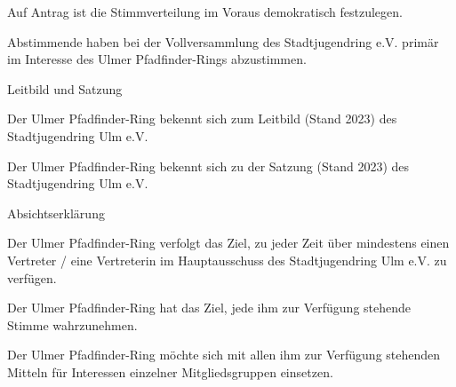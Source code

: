 \begin{legal}
\begin{legal}
\begin{legal}
                    \item Auf Antrag ist die Stimmverteilung im Voraus demokratisch festzulegen.
                    \item Abstimmende haben bei der Vollversammlung des Stadtjugendring e.V. primär 
                          im Interesse des Ulmer Pfadfinder-Rings abzustimmen.
                \end{legal}
            \item Leitbild und Satzung
                \begin{legal}
                    \item Der Ulmer Pfadfinder-Ring bekennt sich zum Leitbild (Stand 2023) des 
                          Stadtjugendring Ulm e.V.
                    \item Der Ulmer Pfadfinder-Ring bekennt sich zu der Satzung (Stand 2023) des 
                          Stadtjugendring Ulm e.V.
                \end{legal}
        \end{legal}
    \item Absichtserklärung
        \begin{legal}
            \item Der Ulmer Pfadfinder-Ring verfolgt das Ziel, zu jeder Zeit über mindestens einen 
                  Vertreter / eine Vertreterin im Hauptausschuss des Stadtjugendring Ulm e.V. 
                  zu verfügen.
            \item Der Ulmer Pfadfinder-Ring hat das Ziel, jede ihm zur Verfügung stehende Stimme 
                  wahrzunehmen.
            \item Der Ulmer Pfadfinder-Ring möchte sich mit allen ihm zur Verfügung stehenden 
                  Mitteln für Interessen einzelner Mitgliedsgruppen einsetzen.
        \end{legal}
\end{legal}
